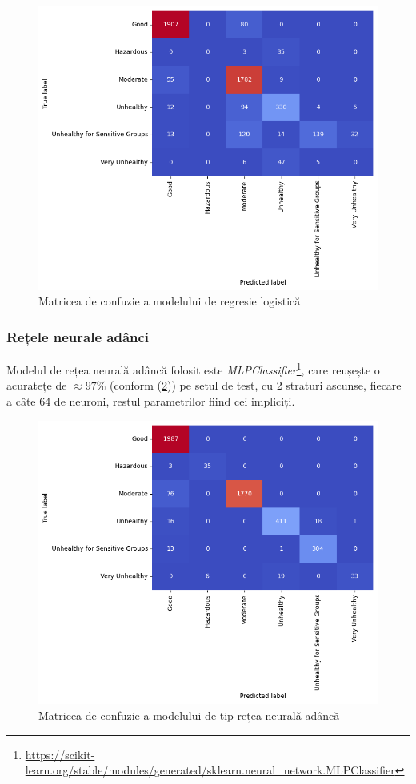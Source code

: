 \documentclass{article}
\begin{document}
\begin{figure}[htb]
    \centering
    \includegraphics[scale=0.5]{air_pollution/learning/logistic_conf.png}
    \caption{Matricea de confuzie a modelului de regresie logistică}
    \label{fig:pol:log_conf}
\end{figure}

\subsubsection{Rețele neurale adânci}
Modelul de rețea neurală adâncă folosit este
\textit{MLPClassifier}\footnote{
    \url{https://scikit-learn.org/stable/modules/generated/sklearn.neural_network.MLPClassifier}
}, care reușește o acuratețe de $\approx 97\%$ (conform (\ref{fig:pol:nn_conf}))
pe setul de test, cu 2 straturi ascunse, fiecare a câte 64 de neuroni, restul 
parametrilor fiind cei impliciți.

\begin{figure}[htb]
    \centering
    \includegraphics[scale=0.5]{air_pollution/learning/neural_network_conf.png}
    \caption{Matricea de confuzie a modelului de tip rețea neurală adâncă}
    \label{fig:pol:nn_conf}
\end{figure}
\end{document}
